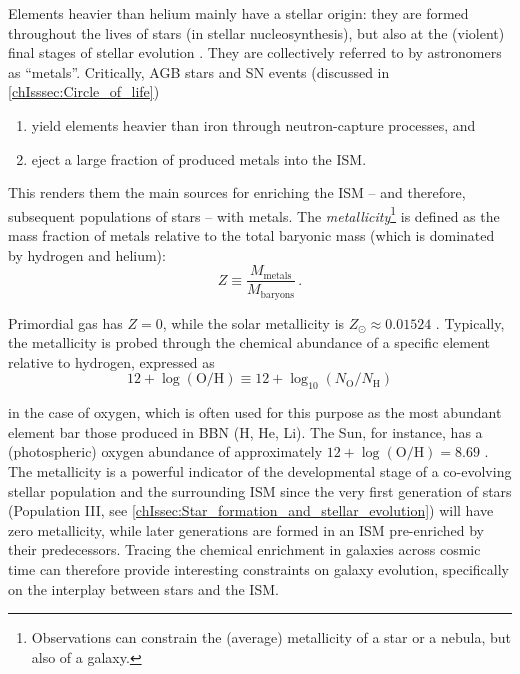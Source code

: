 Elements heavier than helium mainly have a stellar origin: they are formed throughout the lives of stars (in stellar nucleosynthesis), but also at the (violent) final stages of stellar evolution . They are collectively referred to by astronomers as ``metals''. Critically, AGB stars and SN events (discussed in \cref{chIsssec:Circle_of_life})
\begin{enumerate}[label=(\roman*)]
    \item yield elements heavier than iron through neutron-capture processes, and
    \item eject a large fraction of produced metals into the ISM.
\end{enumerate}

This renders them the main sources for enriching the ISM -- and therefore, subsequent populations of stars -- with metals. The \textit{metallicity}\footnote{Observations can constrain the (average) metallicity of a star or a nebula, but also of a galaxy.} is defined as the mass fraction of metals relative to the total baryonic mass (which is dominated by hydrogen and helium):
\begin{equation}
    \label{chIeq:Metallicity}
    Z \equiv \frac{M_\text{metals}}{M_\text{baryons}} \, .
\end{equation}

Primordial gas has $Z = 0$, while the solar metallicity is $Z_\odot \approx 0.01524$ \citep[][; we note that a fiducial value of $Z_\odot = 0.02$ is often adopted, however]{2012MNRAS.427..127B}. Typically, the metallicity is probed through the chemical abundance of a specific element relative to hydrogen, expressed as
\begin{equation}
    \label{chIeq:Oxygen_abundance}
    12 + \log \left( \mathrm{O/H} \right) \equiv 12 + \log_{10} \left( N_\text{O}/N_\text{H} \right)
\end{equation}

\noindent in the case of oxygen, which is often used for this purpose as the most abundant element bar those produced in BBN (H, He, Li). The Sun, for instance, has a (photospheric) oxygen abundance of approximately $12 + \log \left( \mathrm{O/H} \right) = 8.69$ \citep{2009ARA&A..47..481A}. The metallicity is a powerful indicator of the developmental stage of a co-evolving stellar population and the surrounding ISM since the very first generation of stars (Population III, see \cref{chIssec:Star_formation_and_stellar_evolution}) will have zero metallicity, while later generations are formed in an ISM pre-enriched by their predecessors. Tracing the chemical enrichment in galaxies across cosmic time can therefore provide interesting constraints on galaxy evolution, specifically on the interplay between stars and the ISM.

